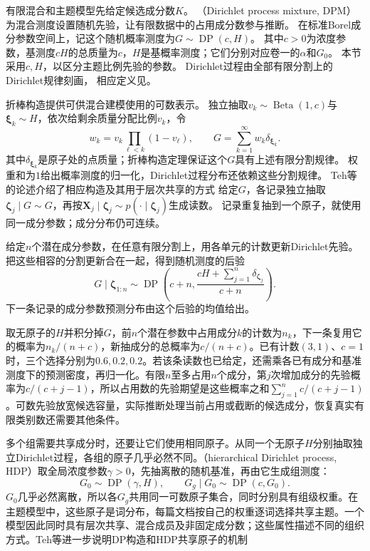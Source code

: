 有限混合和主题模型先给定候选成分数$K$。
（Dirichlet process mixture, DPM）为混合测度设置随机先验，让有限数据中的占用成分数参与推断。
在标准Borel成分参数空间上，记这个随机概率测度为$G\sim\operatorname{DP}(c,H)$。
其中$c>0$为浓度参数，基测度$cH$的总质量为$c$，$H$是基概率测度；它们分别对应卷一的$\alpha$和$G_0$。
本节采用$c,H$，以区分主题比例先验的参数。
Dirichlet过程由全部有限分割上的Dirichlet规律刻画，
相应定义见。

折棒构造提供可供混合建模使用的可数表示。
独立抽取$v_k\sim\operatorname{Beta}(1,c)$与$\bm\xi_k\sim H$，依次给剩余质量分配比例$v_k$，令
\[
  w_k=v_k\prod_{\ell<k}(1-v_\ell),\qquad
  G=\sum_{k=1}^{\infty}w_k\delta_{\bm{\xi}_k}.
\]
其中$\delta_{\bm\xi_k}$是原子处的点质量；折棒构造定理保证这个$G$具有上述有限分割规律。
权重和为$1$给出概率测度的归一化，Dirichlet过程分布还依赖这些分割规律。
Teh等的论述介绍了相应构造及其用于层次共享的方式
给定$G$，各记录独立抽取$\bm\zeta_j\mid G\sim G$，再按$\bm X_j\mid\bm\zeta_j\sim p(\cdot\mid\bm\zeta_j)$生成读数。
记录重复抽到一个原子，就使用同一成分参数；成分分布仍可连续。

给定$n$个潜在成分参数，在任意有限分割上，用各单元的计数更新Dirichlet先验。
把这些相容的分割更新合在一起，得到随机测度的后验
\[
  G\mid\bm\zeta_{1:n}\sim\operatorname{DP}
    \left(c+n,\frac{cH+\sum_{j=1}^n\delta_{\bm\zeta_j}}{c+n}\right).
\]
下一条记录的成分参数预测分布由这个后验的均值给出。

取无原子的$H$并积分掉$G$，前$n$个潜在参数中占用成分$k$的计数为$n_k$，下一条复用它的概率为$n_k/(n+c)$，新抽成分的总概率为$c/(n+c)$。已有计数$(3,1)$、$c=1$时，三个选择分别为$0.6,0.2,0.2$。若该条读数也已给定，还需乘各已有成分和基准测度下的预测密度，再归一化。有限$n$至多占用$n$个成分，第$j$次增加成分的先验概率为$c/(c+j-1)$，所以占用数的先验期望是这些概率之和$\sum_{j=1}^n c/(c+j-1)$。可数先验放宽候选容量，实际推断处理当前占用或截断的候选成分，恢复真实有限类别数还需要其他条件。

多个组需要共享成分时，还要让它们使用相同原子。从同一个无原子$H$分别抽取独立Dirichlet过程，各组的原子几乎必然不同。（hierarchical Dirichlet process, HDP）取全局浓度参数$\gamma>0$，先抽离散的随机基准，再由它生成组测度：
\begin{equation}
  \label{eq:pgm-static-directed-hdp}
  G_0\sim\operatorname{DP}(\gamma,H),\qquad
  G_g\mid G_0\sim\operatorname{DP}(c,G_0).
\end{equation}
$G_0$几乎必然离散，所以各$G_g$共用同一可数原子集合，同时分别具有组级权重。在主题模型中，这些原子是词分布，每篇文档按自己的权重逐词选择共享主题。一个模型因此同时具有层次共享、混合成员及非固定成分数；这些属性描述不同的组织方式。Teh等进一步说明DP构造和HDP共享原子的机制

